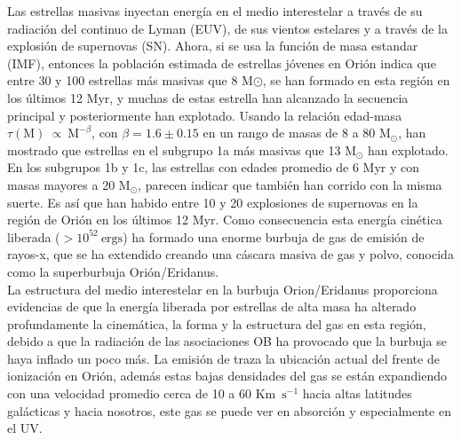 Las estrellas masivas inyectan energía en el medio interestelar a través de su radiación del continuo de Lyman (EUV), de sus vientos estelares y a través de la explosión de supernovas (SN). Ahora, si se usa la función de masa estandar (IMF), entonces la población estimada de estrellas jóvenes en Orión indica que entre 30 y 100 estrellas más masivas que 8 M\(\odot\), se han formado en esta región en los últimos 12 Myr, y muchas de estas estrella han alcanzado la secuencia principal y posteriormente han explotado. Usando la relación edad-masa \(\tau(\text{M})~\propto~\text{M}^{-\beta}\), con \(\beta = 1.6 \pm 0.15\) en un rango de masas de 8 a 80 \(\text{M}_{\odot}\), \citet{Shull:1995} han mostrado que estrellas en el subgrupo 1a más masivas que 13 \(\text{M}_{\odot}\) han explotado. En los subgrupos 1b y 1c, las estrellas con edades promedio de 6 Myr y con masas mayores a 20 \(\text{M}_{\odot}\), parecen indicar que también han corrido con la misma suerte. Es así que han habido entre 10 y 20 explosiones de supernovas en la región de Orión en los últimos 12 Myr. Como consecuencia esta energía cinética liberada (\(>10^{52}~\text{ergs}\)) ha formado una enorme burbuja de gas de emisión de rayos-x, que se ha extendido creando una cáscara masiva de gas y polvo, conocida como la superburbuja Orión/Eridanus.\\

La estructura del medio interestelar en la burbuja Orion/Eridanus proporciona evidencias de que la energía liberada por estrellas de alta masa ha alterado profundamente la cinemática, la forma y la estructura del gas en esta región, debido a que la radiación de las asociaciones OB ha provocado que la burbuja se haya inflado un poco más. La emisión de \ha{} traza la ubicación actual del frente de ionización en Orión, además estas bajas densidades del gas se están expandiendo con una velocidad promedio cerca de 10 a 60 Km~\(\text{s}^{-1}\) hacia altas latitudes galácticas y hacia nosotros, este gas se puede ver en absorción y especialmente en el UV.\\
         
